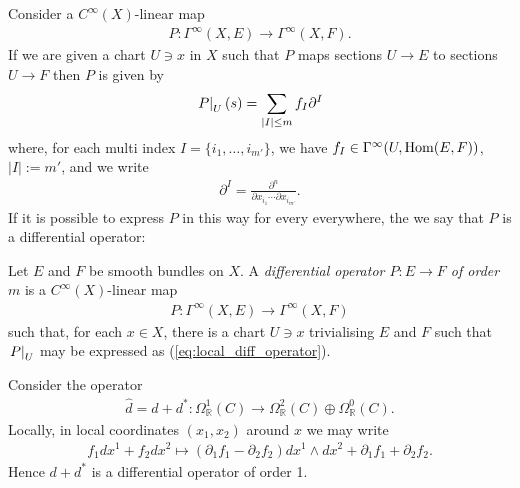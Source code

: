 \documentclass[12pt]{ociamthesis}  %
\begin{document}
Consider a $C^\infty(X)$-linear map
\begin{align*}
  P : \Gamma^\infty(X,E) \to \Gamma^\infty(X,F).
\end{align*}
If we are given a chart $U\ni x$ in $X$ such that $P$ maps sections
$U\to E$ to sections $U\to F$ then $P$ is given by
\begin{align}\label{eq:local_diff_operator}
  \left.{P}\right\vert_{U}(s) = \sum_{|I|\leq m} f_I \partial^I
\end{align}
where, for each multi index $I=\{i_1,\ldots,i_{m'}\}$, we have
$f_I\in\Gamma^\infty(U,\operatorname{Hom}(E,F))$, $|I| := m'$, and we write
\begin{align*}
  \partial^I = \frac{\partial^n}{\partial x_{i_1} \cdots \partial x_{i_{m'}}}.
\end{align*}
If it is possible to express $P$ in this way for every everywhere,
the we say that $P$ is a differential operator:

\begin{definition}\label{def:diff_operator}
  Let $E$ and $F$ be smooth bundles on $X$. A \emph{differential
    operator $P:E\to F$ of order $m$} is a $C^\infty(X)$-linear map
  \begin{align*}
    P : \Gamma^\infty(X,E) \to \Gamma^\infty(X,F)
  \end{align*}
  such that, for each $x\in X$, there is a chart $U\ni x$ trivialising $E$ and
  $F$ such that $\left.{P}\right\vert_{U}$ may be expressed as
  (\ref{eq:local_diff_operator}).
\end{definition}

\begin{example}
  Consider the operator
  \begin{align}\label{eq:d_hat}
    \hat d = d + d^* : \Omega^1_{\mathbb R}(C) \to \Omega^2_{\mathbb R}(C) \oplus \Omega^0_{\mathbb R}(C).
  \end{align}
  Locally, in local coordinates $(x_1,x_2)$ around $x$ we may write
  \begin{align*}
    f_1 dx^1 + f_2 dx^2 \mapsto
    (\partial_1 f_1 - \partial_2 f_2)dx^1\wedge dx^2
    + \partial_1 f_1 + \partial_2 f_2 .
  \end{align*}
  Hence $d + d^*$ is a differential operator of order 1.
\end{example}
\end{document}
